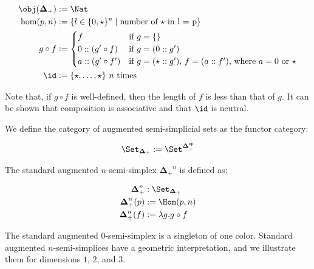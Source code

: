 \documentclass[10pt]{art.cls/art}
\newcommand{\DeltaPlus}{\ensuremath{\boldsymbol{\Delta}_+}}
\newcommand{\kstar}{{\star}}
\begin{document}
\begin{definition}[$\DeltaPlus$]
  \begin{align*}
    \obj(\DeltaPlus) & := \Nat                                                                     \\
    \hom(p, n)       & := \{l \in \{0, \kstar\}^n \mid \text{number of $\kstar$ in l = p}\}        \\
    g \circ f        & :=
    \begin{cases}
      f                  & \text{if $g = \{\}$}                                                      \\
      0 :: (g' \circ f)  & \text{if $g = (0 :: g')$}                                                 \\
      a :: (g' \circ f') & \text{if $g = (\star :: g')$, $f = (a :: f')$, where $a = 0$ or $\kstar$} \\
    \end{cases} \\
    \id              & := \{\kstar, \ldots, \kstar\} \text{ $n$ times}
  \end{align*}

  Note that, if $g \circ f$ is well-defined, then the length of $f$ is less than that of $g$. It can be shown that composition is associative and that $\id$ is neutral.
\end{definition}

\begin{definition}[$\Set_{\DeltaPlus}$]
  We define the category of augmented semi-simplicial sets as the functor category:

  \begin{equation*}
    \Set_{\DeltaPlus} := \Set^{\DeltaPlus^{\mathsf{op}}}
  \end{equation*}
\end{definition}

\begin{definition}[$\DeltaPlus^n$]
  The standard augmented $n$-semi-simplex $\DeltaPlus^n$ is defined as:

  \begin{align*}
    \DeltaPlus^n    & : \Set_{\DeltaPlus}      \\
    \DeltaPlus^n(p) & := \Hom(p, n)            \\
    \DeltaPlus^n(f) & := \lambda g . g \circ f
  \end{align*}
\end{definition}

The standard augmented $0$-semi-simplex is a singleton of one color. Standard augmented $n$-semi-simplices have a geometric interpretation, and we illustrate them for dimensions $1$, $2$, and $3$.
\end{document}
